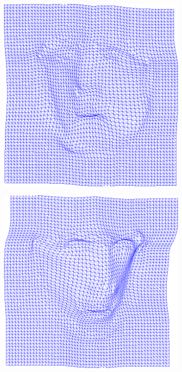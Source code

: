 \begin{figure}[t!]
    \centering
    \begin{subfigure}[b]{0.15\textwidth}
            \includegraphics[width=\textwidth]{resources/Fig_Flows/0}
    \end{subfigure}
    \hfill
    \begin{subfigure}[b]{0.15\textwidth}
            \includegraphics[width=\textwidth]{resources/Fig_Flows/1}

\end{subfigure}
\end{figure}
